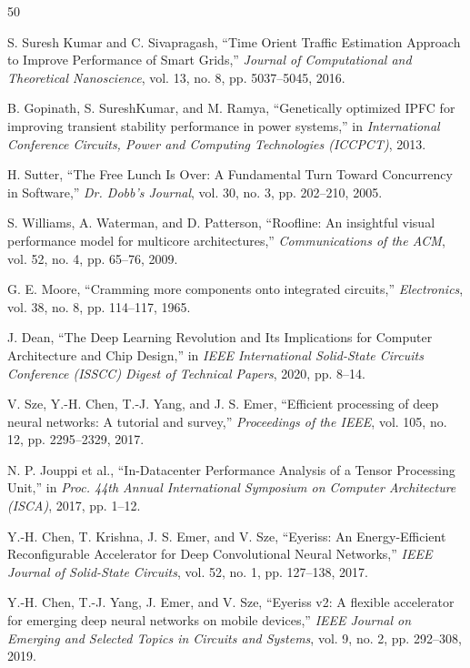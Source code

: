 \documentclass[conference]{IEEEtran}
\begin{document}
\begin{thebibliography}{50}

 S. Suresh Kumar and C. Sivapragash, ``Time Orient Traffic Estimation Approach to Improve Performance of Smart Grids,'' \textit{Journal of Computational and Theoretical Nanoscience}, vol. 13, no. 8, pp. 5037--5045, 2016.

 B. Gopinath, S. SureshKumar, and M. Ramya, ``Genetically optimized IPFC for improving transient stability performance in power systems,'' in \textit{International Conference Circuits, Power and Computing Technologies (ICCPCT)}, 2013.

 H. Sutter, ``The Free Lunch Is Over: A Fundamental Turn Toward Concurrency in Software,'' \textit{Dr. Dobb's Journal}, vol. 30, no. 3, pp. 202--210, 2005.

 S. Williams, A. Waterman, and D. Patterson, ``Roofline: An insightful visual performance model for multicore architectures,'' \textit{Communications of the ACM}, vol. 52, no. 4, pp. 65--76, 2009.

 G. E. Moore, ``Cramming more components onto integrated circuits,'' \textit{Electronics}, vol. 38, no. 8, pp. 114--117, 1965.

 J. Dean, ``The Deep Learning Revolution and Its Implications for Computer Architecture and Chip Design,'' in \textit{IEEE International Solid-State Circuits Conference (ISSCC) Digest of Technical Papers}, 2020, pp. 8--14.

 V. Sze, Y.-H. Chen, T.-J. Yang, and J. S. Emer, ``Efficient processing of deep neural networks: A tutorial and survey,'' \textit{Proceedings of the IEEE}, vol. 105, no. 12, pp. 2295--2329, 2017.

 N. P. Jouppi et al., ``In-Datacenter Performance Analysis of a Tensor Processing Unit,'' in \textit{Proc. 44th Annual International Symposium on Computer Architecture (ISCA)}, 2017, pp. 1--12.

 Y.-H. Chen, T. Krishna, J. S. Emer, and V. Sze, ``Eyeriss: An Energy-Efficient Reconfigurable Accelerator for Deep Convolutional Neural Networks,'' \textit{IEEE Journal of Solid-State Circuits}, vol. 52, no. 1, pp. 127--138, 2017.

 Y.-H. Chen, T.-J. Yang, J. Emer, and V. Sze, ``Eyeriss v2: A flexible accelerator for emerging deep neural networks on mobile devices,'' \textit{IEEE Journal on Emerging and Selected Topics in Circuits and Systems}, vol. 9, no. 2, pp. 292--308, 2019.


\end{thebibliography}
\end{document}
